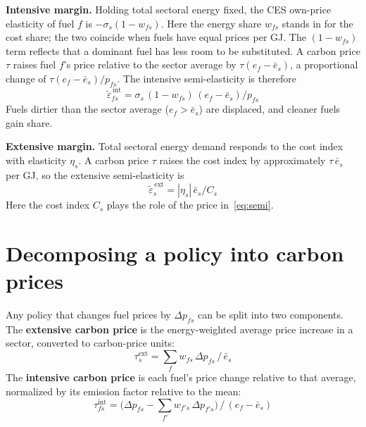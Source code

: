 \documentclass[11pt,a4paper]{article}
\begin{document}
\textbf{Intensive margin.} Holding total sectoral energy fixed, the CES own-price elasticity of fuel $f$ is $-\sigma_s(1-w_{fs})$. Here the energy share $w_{fs}$ stands in for the cost share; the two coincide when fuels have equal prices per GJ. The $(1-w_{fs})$ term reflects that a dominant fuel has less room to be substituted. A carbon price $\tau$ raises fuel $f$'s price relative to the sector average by $\tau(e_f-\bar{e}_s)$, a proportional change of $\tau(e_f-\bar{e}_s)/p_{fs}$. The intensive semi-elasticity is therefore
\begin{equation}\label{eq:semi-int}
\tilde{\varepsilon}^{\,\mathrm{int}}_{fs} = \sigma_s\,(1-w_{fs})\,(e_f-\bar{e}_s)/p_{fs}
\end{equation}
Fuels dirtier than the sector average ($e_f > \bar{e}_s$) are displaced, and cleaner fuels gain share.

\textbf{Extensive margin.} Total sectoral energy demand responds to the cost index with elasticity $\eta_s$. A carbon price $\tau$ raises the cost index by approximately $\tau\,\bar{e}_s$ per GJ, so the extensive semi-elasticity is
\begin{equation}\label{eq:semi-ext}
\tilde{\varepsilon}^{\,\mathrm{ext}}_{s} = |\eta_s|\,\bar{e}_s/C_s
\end{equation}
Here the cost index $C_s$ plays the role of the price in~\eqref{eq:semi}.

\newpage
\section{Decomposing a policy into carbon prices}\label{sec:decomp}

Any policy that changes fuel prices by $\Delta p_{fs}$ can be split into two components. The \textbf{extensive carbon price} is the energy-weighted average price increase in a sector, converted to carbon-price units:
\begin{equation}\label{eq:tau-ext}
\tau^{\mathrm{ext}}_s = \textstyle\sum_f w_{fs}\,\Delta p_{fs}\,/\,\bar{e}_s
\end{equation}
The \textbf{intensive carbon price} is each fuel's price change relative to that average, normalized by its emission factor relative to the mean:
\begin{equation}\label{eq:tau-int}
\tau^{\mathrm{int}}_{fs} = \big(\Delta p_{fs} - \textstyle\sum_{f'} w_{f's}\,\Delta p_{f's}\big)\,/\,(e_f-\bar{e}_s)
\end{equation}
\end{document}
